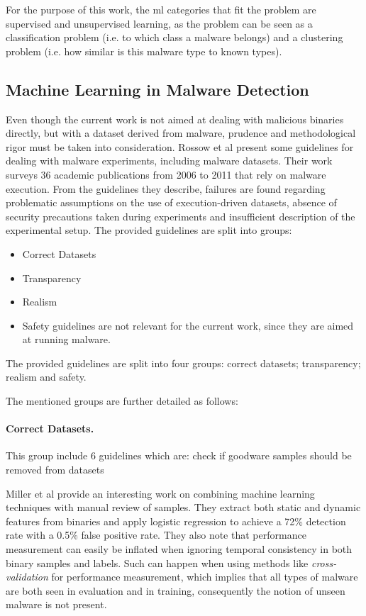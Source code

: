 \documentclass{llncs}
\begin{document}
For the purpose of this work, the \gls{ml} categories that fit the problem are supervised and unsupervised learning, as the problem can be seen as a classification problem (i.e. to which class a malware belongs) and a clustering problem (i.e. how similar is this malware type to known types).

\clearpage

\subsection{Machine Learning in Malware Detection}

Even though the current work is not aimed at dealing with malicious binaries directly, but with a dataset derived from malware, prudence and methodological rigor must be taken into consideration. Rossow et al \cite{rossow:practices} present some guidelines for dealing with malware experiments, including malware datasets. Their work surveys 36 academic publications from 2006 to 2011 that rely on malware execution. From the guidelines they describe, failures are found regarding problematic assumptions on the use of execution-driven datasets, absence of security precautions taken during experiments and insufficient description of the experimental setup. The provided guidelines are split into groups:
\begin{itemize}
	\item Correct Datasets
	\item Transparency
	\item Realism
	\item Safety guidelines are not relevant for the current work, since they are aimed at running malware.
\end{itemize}



The provided guidelines are split into four groups: correct datasets; transparency; realism and safety.

The mentioned groups are further detailed as follows:

\paragraph{Correct Datasets.} This group include 6 guidelines which are: check if goodware samples should be removed from datasets

Miller et al provide an interesting work on combining machine learning techniques with manual review of samples\cite{miller:rev_int}. They extract both static and dynamic features from binaries and apply logistic regression to achieve a 72\% detection rate with a 0.5\% false positive rate. They also note that performance measurement can easily be inflated when ignoring temporal consistency in both binary samples and labels. Such can happen when using methods like \textit{cross-validation} for performance measurement, which implies that all types of malware are both seen in evaluation and in training, consequently the notion of unseen malware is not present.
\end{document}
